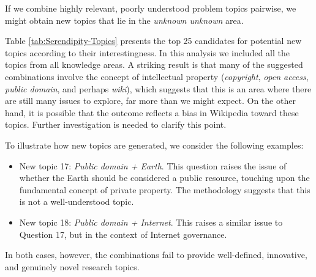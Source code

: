 If we combine highly relevant, poorly understood problem topics pairwise, we might obtain new topics that lie in the \emph{unknown unknown} area.

Table \ref{tab:Serendipity-Topics} presents the top 25 candidates for potential new topics according to their interestingness. In this analysis we included all the topics from all knowledge areas. A striking result is that many of the suggested combinations involve the concept of intellectual property (\emph{copyright}, \emph{open access}, \emph{public domain}, and perhaps \emph{wiki}), which suggests that this is an area where there are still many issues to explore, far more than we might expect. On the other hand, it is possible that the outcome reflects a bias in Wikipedia toward these topics. Further investigation is needed to clarify this point.

To illustrate how new topics are generated, we consider the following examples:

\begin{itemize}
\item New topic 17: \emph{Public domain + Earth}. This question raises the issue of whether the Earth should be considered a public resource, touching upon the fundamental concept of private property. The methodology suggests that this is not a well-understood topic.
\item New topic 18: \emph{Public domain + Internet}. This raises a similar issue to Question 17, but in the context of Internet governance.
\end{itemize}

In both cases, however, the combinations fail to provide well-defined, innovative, and genuinely novel research topics.


